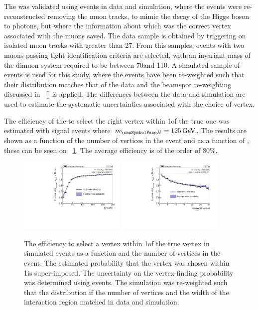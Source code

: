 The \VtxIdBdt was validated using \Zmumu events in data and simulation, where the events were re-reconstructed removing the muon tracks, to mimic the decay of the Higgs boson to photons, but where the information about which was the correct vertex associated with the muons saved. The data sample is obtained by triggering on isolated muon tracks with \pT greater than 27\GeV. From this samples, events with two muons passing tight identification criteria are selected, with an invariant mass of the dimuon system required to be between 70\GeV and 110\GeV. A simulated sample of \Zmumu events is used for this study, where the events have been re-weighted such that their \PU distribution matches that of the data and the beamspot re-weighting discussed in \Sec~\ref{} is applied. The differences between the data and simulation are used to estimate the systematic uncertainties associated with the choice of vertex. %

The efficiency of the \VtxIdBdt to select the right vertex within 1\cm of the true one was estimated with signal events where $\mH=125\GeV$. The results are shown as a function of the number of vertices in the event and as a function of \pT, these can be seen on \Fig~\ref{fig:reco:vtxidbdt_eff}. The average efficiency is of the order of 80\%. 

\begin{figure}[h]
\centering
\includegraphics[width=0.45\textwidth]{recoFigures/Pt2016PU125BSReweighted12.pdf}
\includegraphics[width=0.45\textwidth]{recoFigures/Nvtx2016PU125BSReweighted12.pdf}
\caption{The efficiency to select a vertex within 1\cm of the true vertex in simulated \Hgg events as a function \pT and the number of vertices in the event. The estimated probability that the vertex was chosen within 1\cm is super-imposed. The uncertainty on the vertex-finding probability was determined using \Zmumu events. The simulation was re-weighted such that the distribution if the number of vertices and the width of the interaction region matched in data and simulation. }
\label{fig:reco:vtxidbdt_eff}
\end{figure}

